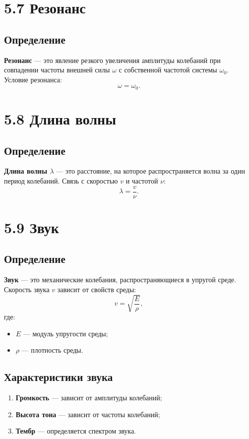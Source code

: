 \documentclass[a4paper, 12pt]{article}
\begin{document}
\section*{5.7 Резонанс}
\vspace{-9pt}
\subsection*{Определение}
\vspace{-3pt}
\textbf{Резонанс} — это явление резкого увеличения амплитуды колебаний при совпадении частоты внешней силы $ \omega$ с собственной частотой системы $ \omega_0$. Условие резонанса:
$$ \omega = \omega_0.$$

\section*{5.8 Длина волны}
\vspace{-9pt}
\subsection*{Определение}
\vspace{-3pt}
\textbf{Длина волны $\lambda$} — это расстояние, на которое распространяется волна за один период колебаний. Связь с скоростью $ v$ и частотой $ \nu$:
$$ \lambda = \frac{v}{\nu}.$$

\section*{5.9 Звук}
\vspace{-9pt}
\subsection*{Определение}
\vspace{-3pt}
\textbf{Звук} — это механические колебания, распространяющиеся в упругой среде. Скорость звука $ v$ зависит от свойств среды:
$$ v = \sqrt{\frac{E}{\rho}},$$
где:
\begin{itemize}[itemsep=0pt, topsep=0pt, parsep=0pt]
  \item $ E$ — модуль упругости среды;
  \item $ \rho$ — плотность среды.
\end{itemize}

\vspace{-9pt}
\subsection*{Характеристики звука}
\vspace{-3pt}
\begin{enumerate}[itemsep=0pt, topsep=0pt, parsep=0pt]
  \item \textbf{Громкость} — зависит от амплитуды колебаний;
  \item \textbf{Высота тона} — зависит от частоты колебаний;
  \item \textbf{Тембр} — определяется спектром звука.
\end{enumerate}
\end{document}
